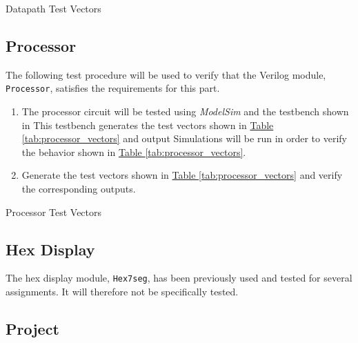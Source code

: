 \begin{table}[htbp]
    \centering
    \caption{Datapath Test Vectors\label{tab:datapath_vectors}}
\end{table}


\subsection{Processor} %
\label{sub:processor}

The following test procedure will be used to verify that the Verilog module, \verb|Processor|, satisfies the requirements for this part.

\begin{enumerate}
    \item The processor circuit will be tested using \emph{ModelSim} and the testbench shown in %
    This testbench generates the test vectors shown in \hyperref[tab:processor_vectors]{Table \ref*{tab:processor_vectors}} and output %
    Simulations will be run in order to verify the behavior shown in \hyperref[tab:processor_vectors]{Table \ref*{tab:processor_vectors}}.
    \item Generate the test vectors shown in \hyperref[tab:processor_vectors]{Table \ref*{tab:processor_vectors}} and verify the corresponding outputs.
\end{enumerate}

\begin{table}[htbp]
    \centering
    \caption{Processor Test Vectors\label{tab:processor_vectors}}
\end{table}


\subsection{Hex Display} %
\label{sub:hex_display}

The hex display module, \verb|Hex7seg|, has been previously used and tested for several assignments.
It will therefore not be specifically tested.

\subsection{Project} %
\label{sub:project}

